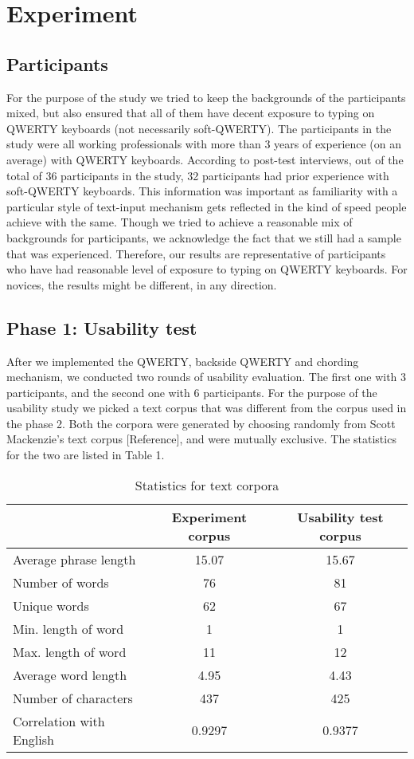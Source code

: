 \section{Experiment}
\subsection{Participants}

For the purpose of the study we tried to keep the backgrounds of the
participants mixed, but also ensured that all of them have decent
exposure to typing on QWERTY keyboards (not necessarily
soft-QWERTY). The participants in the study were all working
professionals with more than 3 years of experience (on an average)
with QWERTY keyboards. According to post-test interviews, out of the
total of 36 participants in the study, 32 participants had prior
experience with soft-QWERTY keyboards. This information was important
as familiarity with a particular style of text-input mechanism gets
reflected in the kind of speed people achieve with the same. Though we
tried to achieve a reasonable mix of backgrounds for participants, we
acknowledge the fact that we still had a sample that was
experienced. Therefore, our results are representative of participants
who have had reasonable level of exposure to typing on QWERTY
keyboards. For novices, the results might be different, in any
direction.

\subsection{Phase 1: Usability test}

After we implemented the QWERTY, backside QWERTY and chording
mechanism, we conducted two rounds of usability evaluation. The first
one with 3 participants, and the second one with 6 participants. For
the purpose of the usability study we picked a text corpus that was
different from the corpus used in the phase 2. Both the corpora were
generated by choosing randomly from Scott Mackenzie's text corpus
[Reference], and were mutually exclusive. The statistics for the two
are listed in Table 1.

\begin{table*}
	\centering
		\begin{tabular}{|l|c|c|} \hline
		                         & Experiment corpus & Usability test corpus \\ \hline
			 Average phrase length & 15.07 & 15.67 \\ \hline
			 Number of words & 76 & 81 \\ \hline
			 Unique words & 62 & 67 \\ \hline
			 Min. length of word & 1 & 1 \\ \hline
			 Max. length of word & 11 & 12 \\ \hline
			 Average word length & 4.95 & 4.43 \\ \hline
			 Number of characters & 437 & 425 \\ \hline
			 Correlation with English & 0.9297 & 0.9377 \\ \hline
		\end{tabular}
	\caption{Statistics for text corpora}
	\label{tab:StatisticsForTextCorpora}
\end{table*}


